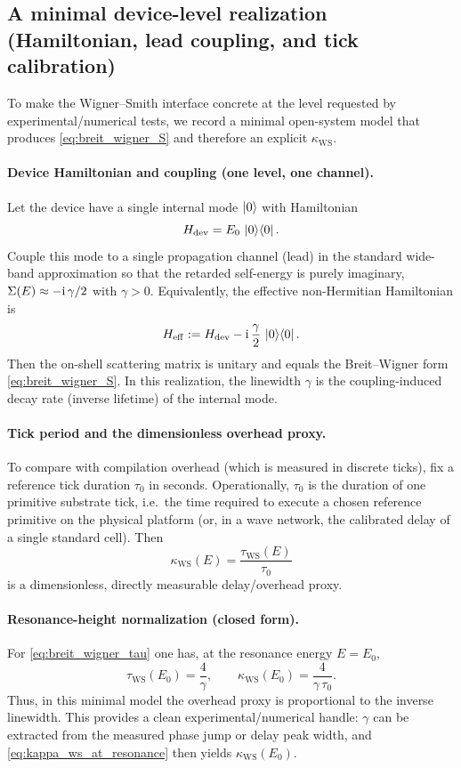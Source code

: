 \subsection{A minimal device-level realization (Hamiltonian, lead coupling, and tick calibration)}
\label{app:wigner_smith_device_level}

To make the Wigner--Smith interface concrete at the level requested by experimental/numerical tests, we record a minimal open-system model that produces \eqref{eq:breit_wigner_S} and therefore an explicit $\kappa_{\mathrm{WS}}$.

\paragraph{Device Hamiltonian and coupling (one level, one channel).}
Let the device have a single internal mode $\ket{0}$ with Hamiltonian
\[
H_{\mathrm{dev}}=E_0\,\ket{0}\!\bra{0}.
\]
Couple this mode to a single propagation channel (lead) in the standard wide-band approximation so that the retarded self-energy is purely imaginary, $\Sigma(E)\approx -\mathrm{i}\,\gamma/2$ with $\gamma>0$.
Equivalently, the effective non-Hermitian Hamiltonian is
\[
H_{\mathrm{eff}}:=H_{\mathrm{dev}}-\mathrm{i}\,\frac{\gamma}{2}\,\ket{0}\!\bra{0}.
\]
Then the on-shell scattering matrix is unitary and equals the Breit--Wigner form \eqref{eq:breit_wigner_S}.
In this realization, the linewidth $\gamma$ is the coupling-induced decay rate (inverse lifetime) of the internal mode.

\paragraph{Tick period and the dimensionless overhead proxy.}
To compare with compilation overhead (which is measured in discrete ticks), fix a reference tick duration $\tau_0$ in seconds.
Operationally, $\tau_0$ is the duration of one primitive substrate tick, i.e.\ the time required to execute a chosen reference primitive on the physical platform (or, in a wave network, the calibrated delay of a single standard cell).
Then
\[
\kappa_{\mathrm{WS}}(E)=\frac{\tau_{\mathrm{WS}}(E)}{\tau_0}
\]
is a dimensionless, directly measurable delay/overhead proxy.

\paragraph{Resonance-height normalization (closed form).}
For \eqref{eq:breit_wigner_tau} one has, at the resonance energy $E=E_0$,
\begin{equation}
\label{eq:kappa_ws_at_resonance}
\tau_{\mathrm{WS}}(E_0)=\frac{4}{\gamma},
\qquad
\kappa_{\mathrm{WS}}(E_0)=\frac{4}{\gamma\,\tau_0}.
\end{equation}
Thus, in this minimal model the overhead proxy is proportional to the inverse linewidth.
This provides a clean experimental/numerical handle: $\gamma$ can be extracted from the measured phase jump or delay peak width, and \eqref{eq:kappa_ws_at_resonance} then yields $\kappa_{\mathrm{WS}}(E_0)$.

